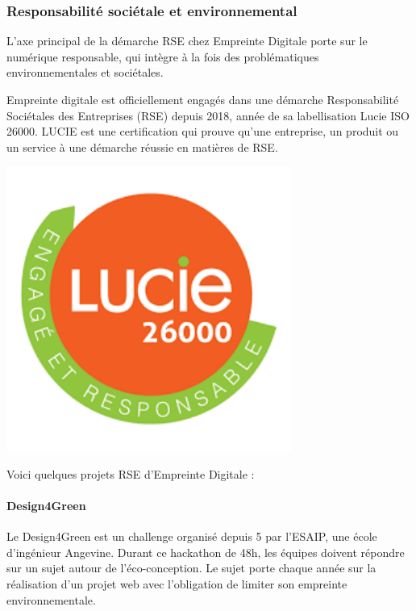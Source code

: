 \documentclass[12pt]{article}
\begin{document}
\subsubsection{Responsabilité sociétale et environnemental}
L'axe principal de la démarche RSE chez Empreinte Digitale porte sur le numérique responsable, qui intègre à la fois des problématiques environnementales et sociétales.

\noindent%
\begin{minipage}{.7\textwidth}%
Empreinte digitale est officiellement engagés dans une démarche Responsabilité Sociétales des Entreprises (RSE) depuis 2018, année de sa labellisation Lucie ISO 26000. 
LUCIE est une certification qui prouve qu'une entreprise, un produit ou un service à une démarche réussie en matières de RSE.

\end{minipage}%
\hfill
\begin{minipage}{.3\textwidth}%
\begin{center}
\includegraphics[width=0.7\textwidth]{src/logo_lucie.png}
\end{center}
\end{minipage}%

Voici quelques projets RSE d'Empreinte Digitale :
\paragraph{Design4Green}
Le Design4Green est un challenge organisé depuis 5 par l'ESAIP, une école d'ingénieur Angevine.
Durant ce hackathon de 48h, les équipes doivent répondre sur un sujet autour de l'éco-conception. 
Le sujet porte chaque année sur la réalisation d'un projet web avec l'obligation de limiter son empreinte environnementale.
\end{document}
